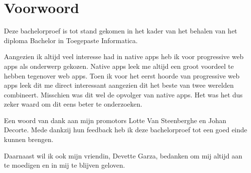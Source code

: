 
\chapter*{Voorwoord}
\label{ch:voorwoord}


Deze bachelorproef is tot stand gekomen in het kader van het behalen van het diploma Bachelor in Toegepaste Informatica.

Aangezien ik altijd veel interesse had in native apps heb ik voor progressive web apps als onderwerp gekozen. Native apps leek me altijd een groot voordeel te hebben tegenover web apps. Toen ik voor het eerst hoorde van progressive web apps leek dit me direct interessant aangezien dit het beste van twee werelden combineert. Misschien was dit wel de opvolger van native apps. Het was het dus zeker waard om dit eens beter te onderzoeken.

Een woord van dank aan mijn promotors Lotte Van Steenberghe en Johan Decorte. Mede dankzij hun feedback heb ik deze bachelorproef tot een goed einde kunnen brengen.

Daarnaast wil ik ook mijn vriendin, Devette Garza, bedanken om mij altijd aan te moedigen en in mij te blijven geloven.


